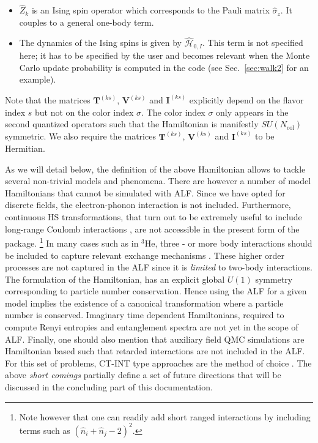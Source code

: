 \documentclass{SciPost}
\begin{document}
\begin{itemize}
\item $\hat{Z}_k$ is an Ising spin operator which corresponds to the Pauli matrix $\hat{\sigma}_{z}$. It couples to a general one-body term. 
\item  The dynamics of the Ising spins is given by $\hat{\mathcal{H}}_{0,I}$. This term is not specified here; 
it has to be specified by the user and becomes relevant when the Monte Carlo update probability is computed in the code (see Sec.~\ref{sec:walk2} for an example).
\end{itemize}
Note that the matrices  $\bm{T}^{(ks)}$,  $\bm{V}^{(ks)}$ and  $\bm{I}^{(ks)}$ explicitly depend on the flavor index $s$ but not on the color index $\sigma$. 
The color index $\sigma$ only appears in  the  second quantized operators such that the Hamiltonian is manifestly $SU(N_{\mathrm{col}})$    symmetric.  We also require
the matrices $\bm{T}^{(ks)}$,  $\bm{V}^{(ks)}$ and  $\bm{I}^{(ks)}$  to be  Hermitian.

As we will detail below, the definition of the above Hamiltonian allows  to tackle  several  non-trivial models and phenomena.  There are however a number of model Hamiltonians that cannot be simulated with ALF.  Since we have opted for discrete  fields,   the electron-phonon interaction is not included. Furthermore, continuous HS transformations, that turn out to be extremely useful to include long-range Coulomb interactions \cite{Brower12,Ulybyshev2013,Hohenadler14},   are not accessible  in the present form of the package. \footnote{Note however that  one can readily add  short ranged interactions  by including terms such as $ (\hat{n}_i + \hat{n}_j - 2 )^2$. } In many cases such as in $^3$He,  three -  or more  body interactions  should be included to capture  relevant   exchange mechanisms \cite{Roger83,JWerner14a}. These higher order processes are   not captured in the ALF since it is \textit{limited}  to two-body interactions.  The formulation of the Hamiltonian, has an  explicit global $U(1)$ symmetry  corresponding to  particle number conservation.  Hence using the ALF for  a given model implies the existence of a canonical transformation where  a particle number is conserved.    Imaginary time dependent Hamiltonians, required to compute Renyi entropies and entanglement spectra   \cite{Broecker14,Assaad15, Broecker16} are not yet in the scope of ALF.  Finally, one should also mention that auxiliary field QMC simulations are Hamiltonian based such that retarded interactions  are not included in the ALF.    For this set of problems, CT-INT type approaches are the method of choice \cite{Assaad07,Werner07,Assaad14_rev}.     The above {\it short comings }  partially define a set of  future directions that will be discussed in the concluding part of this documentation.
%
\end{document}
